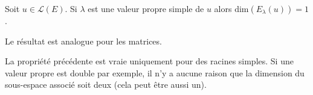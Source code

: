 \documentclass[a4paper,10pt]{report}
\begin{document}
\begin{preuve} 

\vspace{7cm}
\end{preuve}

\begin{cor} Soit $u \in \mathcal{L}(E)$. Si $\lambda$ est une valeur propre simple de $u$ alors $\textrm{dim}(E_{\lambda}(u))=1$.

\noindent Le résultat est analogue pour les matrices.
\end{cor}

\begin{preuve} 

\vspace{3cm}
\end{preuve}

\medskip

\begin{att} La propriété précédente est vraie uniquement pour des racines simples. Si une valeur propre est double par exemple, il n'y a aucune raison que la dimension du sous-espace associé soit deux (cela peut être aussi un).
\end{att}

\medskip
\end{document}

